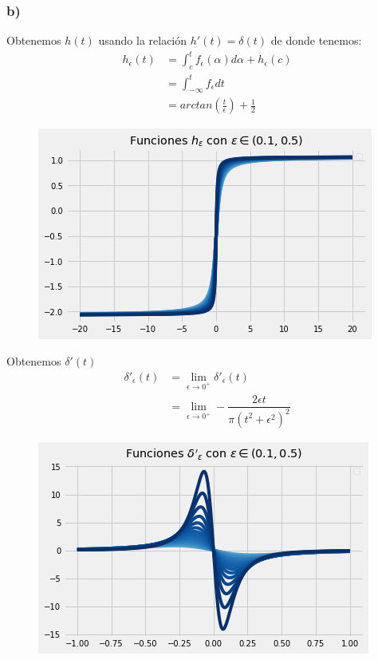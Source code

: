 \documentclass{article}
\begin{document}
\begin{tcolorbox}[breakable]
    \subsubsection*{b)}
    Obtenemos $h(t)$ usando la relación $h'(t) = \delta(t)$ de donde tenemos:
    \begin{align*}
        h_\epsilon(t)
        &= \int_{c}^t f_\epsilon(\alpha) d\alpha + h_\epsilon(c) \\ 
        &= \int_{-\infty}^t f_\epsilon dt \\
        &= arctan\left( \frac{t}{\epsilon} \right) + \frac{1}{2} 
    \end{align*}
    \begin{figure}[H]
        \centering
        \includegraphics[scale=0.7]{images/p2_h.png}
    \end{figure}
    Obtenemos $\delta'(t)$ 
    \begin{align*}
        \delta'_\epsilon(t) 
        &= \lim_{\epsilon \to 0^+} \delta'_\epsilon(t) \\
        &= \lim_{\epsilon \to 0^+} -\dfrac{2{\epsilon}t}{{\pi}\left(t^2+{\epsilon}^2\right)^2}
    \end{align*}
    \begin{figure}[H]
        \centering
        \includegraphics[scale=0.7]{images/p2_f_dot.png}

\end{figure}
\end{tcolorbox}
\end{document}
